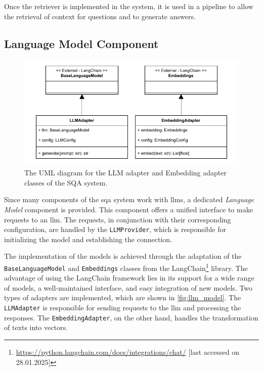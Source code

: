 Once the retriever is implemented in the system, it is used in a pipeline to allow the retrieval of context for questions and to generate answers.

\subsection{Language Model Component}
\label{sec:sqas_architecture_language_model}

\begin{figure}[t]
    \centering
    \includegraphics[width=0.80\linewidth]{figures/framework/figures-llm_model.drawio.pdf}
        \caption[UML Diagram for LLM and Embedding Adapters]{The UML diagram for the LLM adapter and Embedding adapter classes of the SQA system.}
        \label{fig:llm_model}
    \end{figure}

Since many components of the \gls{sqa} system work with \glspl{llm}, a dedicated \emph{Language Model} component is provided. This component offers a unified interface to make requests to an \gls{llm}. The requests, in conjunction with their corresponding configuration, are handled by the \texttt{LLMProvider}, which is responsible for initializing the model and establishing the connection.

The implementation of the models is achieved through the adaptation of the \texttt{BaseLanguageModel} and \texttt{Embeddings} classes from the LangChain\footnote{\url{https://python.langchain.com/docs/integrations/chat/} [last accessed on 28.01.2025]} library. The advantage of using the LangChain framework lies in its support for a wide range of models, a well-maintained interface, and easy integration of new models. Two types of adapters are implemented, which are shown in \autoref{fig:llm_model}. The \texttt{LLMAdapter} is responsible for sending requests to the \gls{llm} and processing the responses. The \texttt{EmbeddingAdapter}, on the other hand, handles the transformation of texts into vectors.

